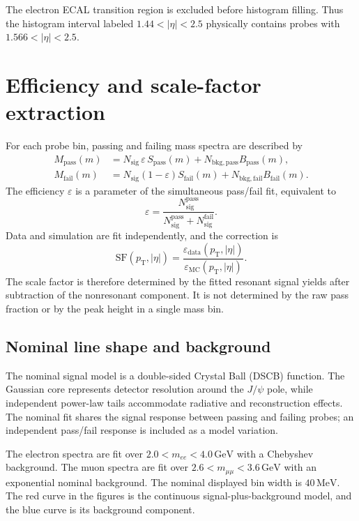 \documentclass[11pt,a4paper]{article}
\newcommand{\pt}{p_{\mathrm{T}}}
\newcommand{\abseta}{|\eta|}
\newcommand{\eff}{\varepsilon}
\newcommand{\SF}{\mathrm{SF}}
\begin{document}
The electron ECAL transition region is excluded before histogram filling.  Thus the histogram interval labeled $1.44<\abseta<2.5$ physically contains probes with $1.566<\abseta<2.5$.

\section{Efficiency and scale-factor extraction}

For each probe bin, passing and failing mass spectra are described by
\begin{align}
  M_{\mathrm{pass}}(m) &= N_{\mathrm{sig}}\,\eff\,S_{\mathrm{pass}}(m)
  + N_{\mathrm{bkg,pass}} B_{\mathrm{pass}}(m),\\
  M_{\mathrm{fail}}(m) &= N_{\mathrm{sig}}(1-\eff)S_{\mathrm{fail}}(m)
  + N_{\mathrm{bkg,fail}} B_{\mathrm{fail}}(m).
\end{align}
The efficiency $\eff$ is a parameter of the simultaneous pass/fail fit, equivalent to
\begin{equation}
  \eff = \frac{N_{\mathrm{sig}}^{\mathrm{pass}}}
  {N_{\mathrm{sig}}^{\mathrm{pass}}+N_{\mathrm{sig}}^{\mathrm{fail}}}.
\end{equation}
Data and simulation are fit independently, and the correction is
\begin{equation}
  \SF(\pt,\abseta)=\frac{\eff_{\mathrm{data}}(\pt,\abseta)}
  {\eff_{\mathrm{MC}}(\pt,\abseta)}.
\end{equation}
The scale factor is therefore determined by the fitted resonant signal yields after subtraction of the nonresonant component.  It is not determined by the raw pass fraction or by the peak height in a single mass bin.

\subsection{Nominal line shape and background}

The nominal signal model is a double-sided Crystal Ball (DSCB) function.  The Gaussian core represents detector resolution around the $J/\psi$ pole, while independent power-law tails accommodate radiative and reconstruction effects.  The nominal fit shares the signal response between passing and failing probes; an independent pass/fail response is included as a model variation.

The electron spectra are fit over $2.0<m_{ee}<4.0\,\mathrm{GeV}$ with a Chebyshev background.  The muon spectra are fit over $2.6<m_{\mu\mu}<3.6\,\mathrm{GeV}$ with an exponential nominal background.  The nominal displayed bin width is $40\,\mathrm{MeV}$.  The red curve in the figures is the continuous signal-plus-background model, and the blue curve is its background component.
\end{document}
